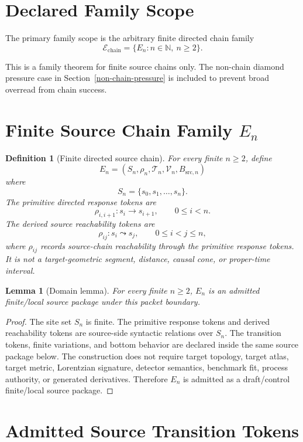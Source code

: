 \documentclass[11pt]{article}
\newcommand{\En}{E_n}
\newtheorem{definition}{Definition}
\newtheorem{lemma}{Lemma}
\begin{document}
\section{Declared Family Scope}

The primary family scope is the arbitrary finite directed chain family
\[
  \mathcal{E}_{\mathrm{chain}}
  = \{\En : n\in\mathbb{N},\ n\ge 2\}.
\]

This is a family theorem for finite source chains only. The non-chain diamond
pressure case in Section~\ref{non-chain-pressure} is included to prevent broad
overread from chain success.

\section{Finite Source Chain Family \(E_n\)}

\begin{definition}[Finite directed source chain]
For every finite \(n\ge 2\), define
\[
  \En=(S_n,\rho_n,\mathcal{T}_n,\mathcal{V}_n,B_{\mathrm{src},n})
\]
where
\[
  S_n=\{s_0,s_1,\ldots,s_n\}.
\]
The primitive directed response tokens are
\[
  \rho_{i,i+1}:s_i\to s_{i+1},\qquad 0\le i<n.
\]
The derived source reachability tokens are
\[
  \rho_{ij}:s_i\leadsto s_j,\qquad 0\le i<j\le n,
\]
where \(\rho_{ij}\) records source-chain reachability through the primitive
response tokens. It is not a target-geometric segment, distance, causal cone,
or proper-time interval.
\end{definition}

\begin{lemma}[Domain lemma]
For every finite \(n\ge 2\), \(\En\) is an admitted finite/local source
package under this packet boundary.
\end{lemma}

\begin{proof}
The site set \(S_n\) is finite. The primitive response tokens and derived
reachability tokens are source-side syntactic relations over \(S_n\). The
transition tokens, finite variations, and bottom behavior are declared inside
the same source package below. The construction does not require target
topology, target atlas, target metric, Lorentzian signature, detector
semantics, benchmark fit, process authority, or generated derivatives.
Therefore \(\En\) is admitted as a draft/control finite/local source package.
\end{proof}

\section{Admitted Source Transition Tokens}
\end{document}

